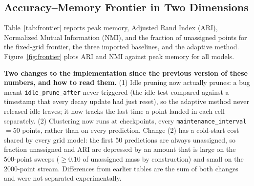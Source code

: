 \documentclass[11pt]{article}
\begin{document}
\subsection{Accuracy--Memory Frontier in Two Dimensions}

Table~\ref{tab:frontier} reports peak memory, Adjusted Rand Index (ARI), Normalized Mutual Information (NMI), and the fraction of unassigned points for the fixed-grid frontier, the three imported baselines, and the adaptive method. Figure~\ref{fig:frontier} plots ARI and NMI against peak memory for all models.

\textbf{Two changes to the implementation since the previous version of these numbers, and how to read them.} (1) Idle pruning now actually prunes: a bug meant \texttt{idle\_prune\_after} never triggered (the idle test compared against a timestamp that every decay update had just reset), so the adaptive method never released idle leaves; it now tracks the last time a point landed in each cell separately. (2) Clustering now runs at checkpoints, every \texttt{maintenance\_interval}$=50$ points, rather than on every prediction. Change (2) has a cold-start cost shared by every grid model: the first 50 predictions are always unassigned, so fraction unassigned and ARI are depressed by an amount that is large on the 500-point sweeps ($\geq 0.10$ of unassigned mass by construction) and small on the 2000-point stream. Differences from earlier tables are the sum of both changes and were not separated experimentally.
\end{document}
